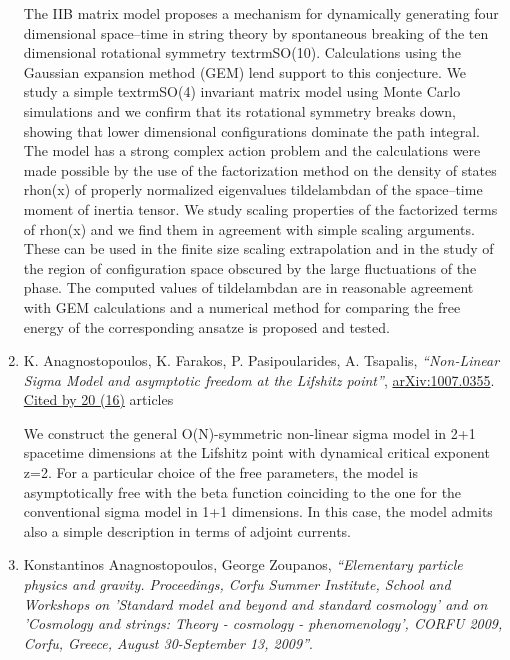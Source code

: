 \documentclass[a4paper,10pt]{article}
\begin{document}
\begin{enumerate}
The IIB matrix model proposes a mechanism for dynamically generating four dimensional space--time in string theory by spontaneous breaking of the ten dimensional rotational symmetry textrm{SO}(10). Calculations using the Gaussian expansion method (GEM) lend support to this conjecture. We study a simple textrm{SO}(4) invariant matrix model using Monte Carlo simulations and we confirm that its rotational symmetry breaks down, showing that lower dimensional configurations dominate the path integral. The model has a strong complex action problem and the calculations were made possible by the use of the factorization method on the density of states rhon(x) of properly normalized eigenvalues tildelambdan of the space--time moment of inertia tensor. We study scaling properties of the factorized terms of rhon(x) and we find them in agreement with simple scaling arguments. These can be used in the finite size scaling extrapolation and in the study of the region of configuration space obscured by the large fluctuations of the phase. The computed values of tildelambdan are in reasonable agreement with GEM calculations and a numerical method for comparing the free energy of the corresponding ansatze is proposed and tested.
\item K. Anagnostopoulos, K. Farakos, P. Pasipoularides, A. Tsapalis, {\it ``Non-Linear Sigma Model and asymptotic freedom at the Lifshitz point''}, \href{https://arxiv.org/abs/1007.0355}{arXiv:1007.0355}.
\\\href{https://inspirehep.net/literature/?q=refersto%3Arecid%3A860357}{Cited by 20 (16)} articles

We construct the general O(N)-symmetric non-linear sigma model in 2+1 spacetime dimensions at the Lifshitz point with dynamical critical exponent z=2. For a particular choice of the free parameters, the model is asymptotically free with the beta function coinciding to the one for the conventional sigma model in 1+1 dimensions. In this case, the model admits also a simple description in terms of adjoint currents.
\item Konstantinos Anagnostopoulos, George Zoupanos, {\it ``Elementary particle physics and gravity. Proceedings, Corfu Summer Institute, School and Workshops on 'Standard model and beyond and standard cosmology' and on 'Cosmology and strings: Theory - cosmology - phenomenology', CORFU 2009, Corfu, Greece, August 30-September 13, 2009''}.



\end{enumerate}
\end{document}
